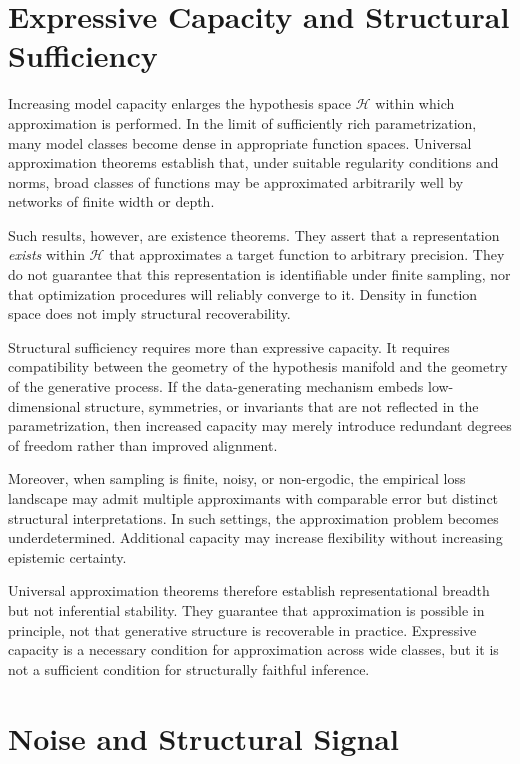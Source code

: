 \documentclass[12pt]{book}
\begin{document}
\section{Expressive Capacity and Structural Sufficiency}

Increasing model capacity enlarges the hypothesis space $\mathcal{H}$ within which approximation is performed. In the limit of sufficiently rich parametrization, many model classes become dense in appropriate function spaces. Universal approximation theorems establish that, under suitable regularity conditions and norms, broad classes of functions may be approximated arbitrarily well by networks of finite width or depth.

Such results, however, are existence theorems. They assert that a representation \emph{exists} within $\mathcal{H}$ that approximates a target function to arbitrary precision. They do not guarantee that this representation is identifiable under finite sampling, nor that optimization procedures will reliably converge to it. Density in function space does not imply structural recoverability.

Structural sufficiency requires more than expressive capacity. It requires compatibility between the geometry of the hypothesis manifold and the geometry of the generative process. If the data-generating mechanism embeds low-dimensional structure, symmetries, or invariants that are not reflected in the parametrization, then increased capacity may merely introduce redundant degrees of freedom rather than improved alignment.

Moreover, when sampling is finite, noisy, or non-ergodic, the empirical loss landscape may admit multiple approximants with comparable error but distinct structural interpretations. In such settings, the approximation problem becomes underdetermined. Additional capacity may increase flexibility without increasing epistemic certainty.

Universal approximation theorems therefore establish representational breadth but not inferential stability. They guarantee that approximation is possible in principle, not that generative structure is recoverable in practice. Expressive capacity is a necessary condition for approximation across wide classes, but it is not a sufficient condition for structurally faithful inference.

\section{Noise and Structural Signal}
\end{document}

